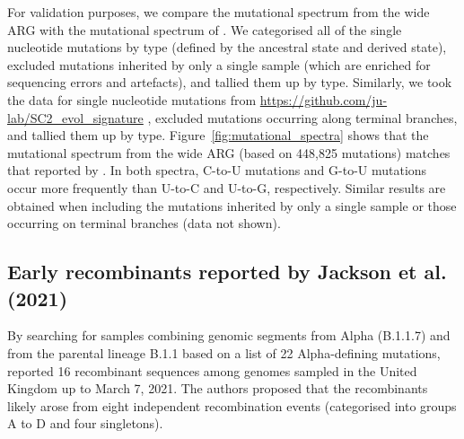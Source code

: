 \documentclass{article}
\begin{document}
For validation purposes, we compare the mutational spectrum from the wide ARG
with the mutational spectrum of \citet{Yi2021-sc}. We categorised all of the
single nucleotide mutations by type (defined by the ancestral state and derived
state), excluded mutations inherited by only a single sample (which are
enriched for sequencing errors and artefacts), and tallied them up by type.
Similarly, we took the data for single nucleotide mutations from
\url{https://github.com/ju-lab/SC2_evol_signature} \citep{Yi2021-sc}, excluded
mutations occurring along terminal branches, and tallied them up by type.
Figure~\ref{fig:mutational_spectra} shows that the mutational spectrum from the
wide ARG (based on 448,825 mutations) matches that reported by \citet[based on
92,344 mutations]{Yi2021-sc}. In both spectra, C-to-U mutations and G-to-U
mutations occur more frequently than U-to-C and U-to-G, respectively. Similar
results are obtained when including the mutations inherited by only a single
sample or those occurring on terminal branches (data not shown).


\subsection{Early recombinants reported by Jackson et al. (2021)}
\label{sec:jackson_recombs}

By searching for samples combining genomic segments from Alpha (B.1.1.7) and
from the parental lineage B.1.1 based on a list of 22 Alpha-defining mutations,
\citet{Jackson2021-ik} reported 16 recombinant sequences among genomes sampled
in the United Kingdom up to March 7, 2021. The authors proposed that the
recombinants likely arose from eight independent recombination events
(categorised into groups A to D and four singletons).

\end{document}

